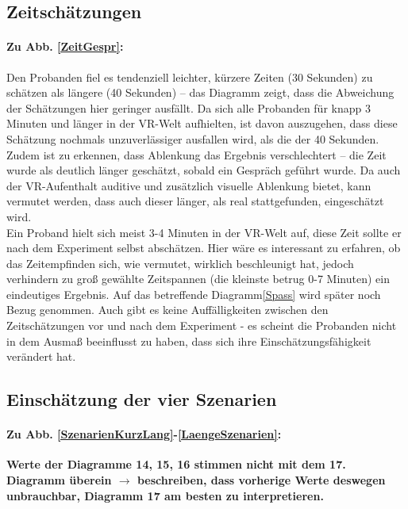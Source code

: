 \documentclass{Paper}
\begin{document}
\subsection{Zeitschätzungen}
\paragraph{Zu Abb. \ref{ZeitGespr}:} Den Probanden fiel es tendenziell leichter, kürzere Zeiten (30 Sekunden) zu schätzen als längere (40 Sekunden) -- das Diagramm zeigt, dass die Abweichung der Schätzungen hier geringer ausfällt. Da sich alle Probanden für knapp 3 Minuten und länger in der VR-Welt aufhielten, ist davon auszugehen, dass diese Schätzung nochmals unzuverlässiger ausfallen wird, als die der 40 Sekunden. Zudem ist zu erkennen, dass Ablenkung das Ergebnis verschlechtert -- die Zeit wurde als deutlich länger geschätzt, sobald ein Gespräch geführt wurde. Da auch der VR-Aufenthalt auditive und zusätzlich visuelle Ablenkung bietet, kann vermutet werden, dass auch dieser länger, als real stattgefunden, eingeschätzt wird.\\
Ein Proband hielt sich meist 3-4 Minuten in der VR-Welt auf, diese Zeit sollte er nach dem Experiment selbst abschätzen. Hier wäre es interessant zu erfahren, ob das Zeitempfinden sich, wie vermutet, wirklich beschleunigt hat, jedoch verhindern zu groß gewählte Zeitspannen (die kleinste betrug 0-7 Minuten) ein eindeutiges Ergebnis. Auf das betreffende Diagramm\ref{Spass} wird später noch Bezug genommen. Auch gibt es keine Auffälligkeiten zwischen den Zeitschätzungen vor und nach dem Experiment - es scheint die Probanden nicht in dem Ausmaß beeinflusst zu haben, dass sich ihre Einschätzungsfähigkeit verändert hat.

\subsection{Einschätzung der vier Szenarien}
\paragraph{Zu Abb. \ref{SzenarienKurzLang}-\ref{LaengeSzenarien}:} \textbf{Werte der Diagramme 14, 15, 16 stimmen nicht mit dem 17. Diagramm überein $\rightarrow$ beschreiben, dass vorherige Werte deswegen unbrauchbar, Diagramm 17 am besten zu interpretieren.}\\
\end{document}
